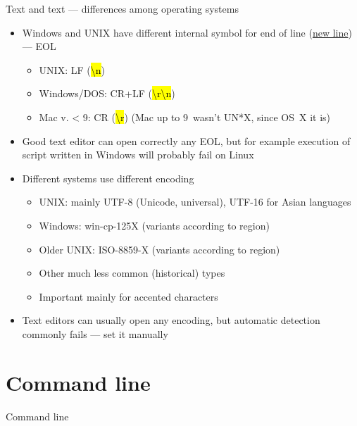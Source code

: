 \documentclass[compress, ucs, xelatex, 11pt, xcolor=svgnames, aspectratio=169,
	hyperref={
		bookmarks=true,
		unicode=true,
		colorlinks=true,
		pdftitle={Linux, command line and MetaCentrum},
		plainpages=false,
		pdfauthor={Vojtech Zeisek},
		pdfsubject={Course about use of Linux command line, writing shell scripts and using MetaCentrum of CESNET},
		pdfcreator={XeLaTeX},
		pdfkeywords={Linux, GNU, BASH, shell, command line, MetaCentrum},
		linkcolor=DarkRed, %
		anchorcolor=DarkBlue, %
		citecolor=Indigo, %
		filecolor=NavyBlue, %
		menucolor=DarkMagenta, %
		urlcolor=DarkBlue, %
		pdftex},
	url={hyphens, lowtilde} %
	]{beamer}
\renewcommand{\texttt}[1]{\hl{\ttfamily #1}}
\begin{document}
\begin{frame}{Text and text --- differences among operating systems}
	\label{eolenc}
	\begin{itemize}
		\item Windows and UNIX have different internal symbol for end of line (\href{https://en.wikipedia.org/wiki/Newline}{new line}) --- EOL
		\begin{itemize}
			\item UNIX: LF (\texttt{\textbackslash n})
			\item Windows/DOS: CR+LF (\texttt{\textbackslash r\textbackslash n})
			\item Mac v. < 9: CR (\texttt{\textbackslash r}) (Mac up to 9~wasn't UN*X, since OS~X it is)
		\end{itemize}
		\item Good text editor can open correctly any EOL, but for example execution of script written in Windows will probably fail on Linux
		\item Different systems use different encoding
		\begin{itemize}
			\item UNIX: mainly UTF-8 (Unicode, universal), UTF-16 for Asian languages
			\item Windows: win-cp-125X (variants according to region)
			\item Older UNIX: ISO-8859-X (variants according to region)
			\item Other much less common (historical) types
			\item Important mainly for accented characters
		\end{itemize}
		\item Text editors can usually open any encoding, but automatic detection commonly fails --- set it manually
	\end{itemize}
\end{frame}

\section{Command line}

\begin{frame}{Command line}
	\tableofcontents[currentsection, sectionstyle=show/hide, hideothersubsections]
\end{frame}
\end{document}
